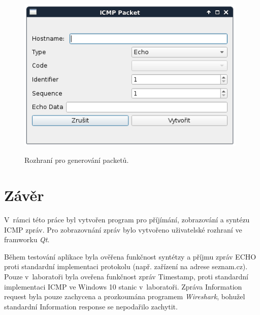\documentclass[12pt, a4paper]{article}
\begin{document}
\begin{figure}[h!]
\centering
\includegraphics[width=110mm]{gui2.png}
\label{gui2}
\caption{Rozhraní pro generování packetů.}
\end{figure}


\newpage

\section{Závěr}

V~rámci této práce byl vytvořen program pro příjímání, zobrazování a syntézu ICMP zpráv. Pro zobrazovnání zpráv bylo vytvořeno uživatelské rozhraní ve framworku \emph{Qt}.

Během testování aplikace byla ověřena funkčnost syntétzy a příjmu zpráv ECHO proti standardní implementaci protokolu (např. zařízení na adrese seznam.cz). Pouze v~laboratoři byla oveřena funkčnost zpráv Timestamp, proti standardní implementaci ICMP ve Windows 10 stanic v~laboratoři. Zpráva Information request byla pouze zachycena a prozkoumána programem \emph{Wireshark}, bohužel standardní Information response se nepodařilo zachytit.
\end{document}
